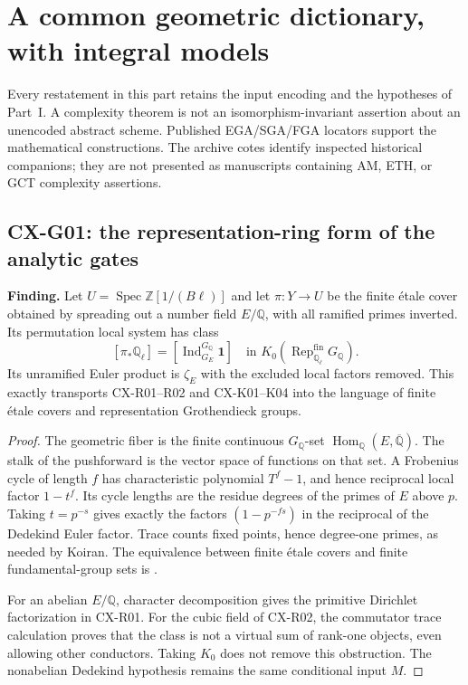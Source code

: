 \section{A common geometric dictionary, with integral models}
\label{sec:common-geometry}

Every restatement in this part retains the input encoding and the hypotheses
of Part~I.  A complexity theorem is not an isomorphism-invariant assertion
about an unencoded abstract scheme.  Published EGA/SGA/FGA locators support
the mathematical constructions.  The archive cotes identify inspected
historical companions; they are not presented as manuscripts containing AM,
ETH, or GCT complexity assertions.

\subsection{CX-G01: the representation-ring form of the analytic gates}
\label{finding:CX-G01}

\textbf{Finding.} Let $U=\operatorname{Spec}\mathbb Z[1/(B\ell)]$ and let
$\pi:Y\to U$ be the finite étale cover obtained by spreading out a number
field $E/\mathbb Q$, with all ramified primes inverted.  Its permutation
local system has class
\[
 [\pi_*\mathbb Q_\ell]
 = [\operatorname{Ind}_{G_E}^{G_{\mathbb Q}}\mathbf1]
 \quad\text{in }K_0(\operatorname{Rep}_{\mathbb Q_\ell}^{\mathrm{fin}}G_{\mathbb Q}).
\]
Its unramified Euler product is $\zeta_E$ with the excluded local factors
removed.  This exactly transports CX-R01--R02 and CX-K01--K04 into the
language of finite étale covers and representation Grothendieck groups.

\begin{proof}
The geometric fiber is the finite continuous $G_{\mathbb Q}$-set
$\operatorname{Hom}_{\mathbb Q}(E,\overline{\mathbb Q})$.
The stalk of the pushforward is the vector space of functions on that set.
A Frobenius cycle of length $f$ has characteristic polynomial $T^f-1$,
and hence reciprocal local factor $1-t^f$.  Its cycle lengths are the
residue degrees of the primes of $E$ above $p$.  Taking $t=p^{-s}$ gives
exactly the factors $(1-p^{-fs})$ in the reciprocal of the Dedekind Euler
factor.  Trace counts fixed points, hence degree-one primes, as needed by
Koiran.  The equivalence between finite étale covers and finite
fundamental-group sets is \cite[Exp.~V, \S4 Theorem~1, and \S7]{SGA1}.

For an abelian $E/\mathbb Q$, character decomposition gives the primitive
Dirichlet factorization in CX-R01.  For the cubic field of CX-R02, the
commutator trace calculation proves that the class is not a virtual sum of
rank-one objects, even allowing other conductors.  Taking $K_0$ does not
remove this obstruction.  The nonabelian Dedekind hypothesis remains the
same conditional input $M$.
\end{proof}

